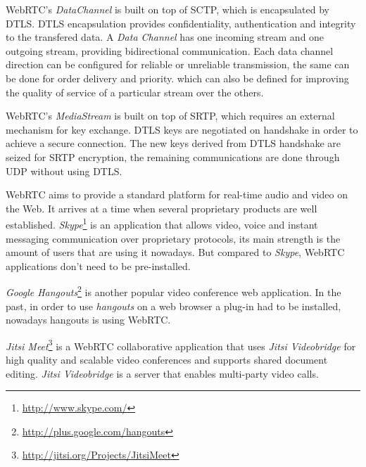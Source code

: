 \ac{WebRTC}'s \emph{DataChannel} is built on top of \ac{SCTP}, which is encapsulated by \ac{DTLS}. \ac{DTLS} encapsulation provides confidentiality, authentication and integrity to the transfered data. A \emph{Data Channel} has one incoming stream and one outgoing stream, providing bidirectional communication. Each data channel direction can be configured for reliable or unreliable transmission, the same can be done for order delivery and priority. which can also be defined for improving the quality of service of a particular stream over the others.

\ac{WebRTC}'s \emph{MediaStream} is built on top of \ac{SRTP}, which requires an external mechanism for key exchange. \ac{DTLS} keys are negotiated on handshake in order to achieve a secure connection. The new keys derived from \ac{DTLS} handshake are seized for \ac{SRTP} encryption, the remaining communications are done through \ac{UDP} without using \ac{DTLS}.

\ac{WebRTC} aims to provide a standard platform for real-time audio and video on the Web. It arrives at a time when several proprietary products are well established.
\emph{Skype}\footnote{\url{http://www.skype.com/}} is an application that allows video, voice and instant messaging communication over proprietary protocols, its main strength is the amount of users that are using it nowadays. But compared to \emph{Skype}, \ac{WebRTC} applications don't need to be pre-installed.

\emph{Google Hangouts}\footnote{\url{http://plus.google.com/hangouts}} is another popular video conference web application.
In the past, in order to use \emph{hangouts} on a web browser a plug-in had to be installed, nowadays hangouts is using \ac{WebRTC}.

\emph{Jitsi Meet}\footnote{\url{http://jitsi.org/Projects/JitsiMeet}} is a \ac{WebRTC} collaborative application that uses \emph{Jitsi Videobridge} for high quality and scalable video conferences and supports shared document editing. \emph{Jitsi Videobridge} is a server that enables multi-party video calls.



